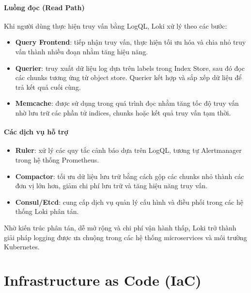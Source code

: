 \paragraph*{Luồng đọc (Read Path)}

Khi người dùng thực hiện truy vấn bằng LogQL, Loki xử lý theo các bước:

\begin{itemize}
    \item \textbf{Query Frontend}: tiếp nhận truy vấn, thực hiện tối ưu hóa và chia nhỏ truy vấn thành nhiều 
    đoạn nhằm tăng hiệu năng.

    \item \textbf{Querier}: truy xuất dữ liệu log dựa trên labels trong Index Store, sau đó đọc các chunks tương ứng 
    từ object store. Querier kết hợp và sắp xếp dữ liệu để trả kết quả cuối cùng.

    \item \textbf{Memcache}: được sử dụng trong quá trình đọc nhằm tăng tốc độ truy vấn nhờ lưu trữ các phần tử 
    indices, chunks hoặc kết quả truy vấn tạm thời.
\end{itemize}

\paragraph*{Các dịch vụ hỗ trợ}

\begin{itemize}
    \item \textbf{Ruler}: xử lý các quy tắc cảnh báo dựa trên LogQL, tương tự Alertmanager trong hệ thống Prometheus.
    \item \textbf{Compactor}: tối ưu dữ liệu lưu trữ bằng cách gộp các chunks nhỏ thành các đơn vị lớn hơn, 
    giảm chi phí lưu trữ và tăng hiệu năng truy vấn.
    \item \textbf{Consul/Etcd}: cung cấp dịch vụ quản lý cấu hình và điều phối trong các hệ thống Loki phân tán.
\end{itemize}

Nhờ kiến trúc phân tán, dễ mở rộng và chi phí vận hành thấp, Loki trở thành giải pháp logging 
được ưa chuộng trong các hệ thống microservices và môi trường Kubernetes.

\clearpage

\section{Infrastructure as Code (IaC)}

